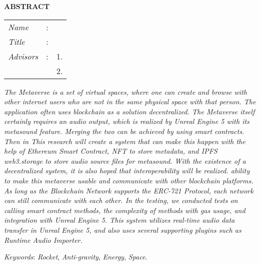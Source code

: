 \begin{center}
  \large\textbf{ABSTRACT}
\end{center}


\vspace{2ex}

\begingroup
\setlength{\tabcolsep}{0pt}

\noindent
\begin{tabularx}{\textwidth}{l >{\centering}m{3em} X}
  \emph{Name}     & : & \name{}         \\

  \emph{Title}    & : & \engtatitle{}   \\

  \emph{Advisors} & : & 1. \advisor{}   \\
                  &   & 2. \coadvisor{} \\
\end{tabularx}
\endgroup

\emph{The Metaverse is a set of virtual spaces, where one can create and browse with other internet users who are not in the same physical space
  with that person. The application often uses blockchain as a solution
  decentralized. The Metaverse itself certainly requires an audio output, which is realized
  by Unreal Engine 5 with its metasound feature.
  Merging the two can be achieved by using smart contracts. Then in
  This research will create a system that can make this happen with the help of Ethereum
  Smart Contract, NFT to store metadata, and IPFS web3.storage to store
  audio source files for metasound.
  With the existence of a decentralized system, it is also hoped that interoperability will be realized.
  ability to make this metaverse usable and communicate with other blockchain platforms.
  As long as the Blockchain Network supports the ERC-721 Protocol, each network can still communicate with 
  each other. In the testing, we conducted tests on calling smart contract methods, the complexity of methods 
  with gas usage, and integration with Unreal Engine 5. This system utilizes real-time audio data transfer in 
  Unreal Engine 5, and also uses several supporting plugins such as Runtime Audio Importer.}

\emph{Keywords}: \emph{Rocket}, \emph{Anti-gravity}, \emph{Energy}, \emph{Space}.

